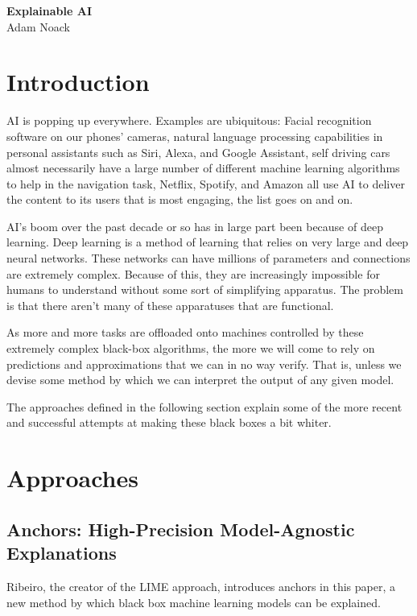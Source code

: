 \documentclass[12pt, letterpaper]{article}
\begin{document}
\begin{center}
\Large{\textbf{Explainable AI}}	\\
Adam Noack
\end{center}
\section{Introduction}
\par AI is popping up everywhere. Examples are ubiquitous: Facial recognition software on our phones' cameras, natural language processing capabilities in personal assistants such as Siri, Alexa, and Google Assistant, self driving cars almost necessarily have a large number of different machine learning algorithms to help in the navigation task, Netflix, Spotify, and Amazon all use AI to deliver the content to its users that is most engaging, the list goes on and on.
\par AI's boom over the past decade or so has in large part been because of deep learning. Deep learning is a method of learning that relies on very large and deep neural networks. These networks can have millions of parameters and connections are extremely complex. Because of this, they are increasingly impossible for humans to understand without some sort of simplifying apparatus. The problem is that there aren't many of these apparatuses that are functional.
\par As more and more tasks are offloaded onto machines controlled by these extremely complex black-box algorithms, the more we will come to rely on predictions and approximations that we can in no way verify. That is, unless we devise some method by which we can interpret the output of any given model.
\par The approaches defined in the following section explain some of the more recent and successful attempts at making these black boxes a bit whiter.
\section{Approaches}
\subsection{Anchors: High-Precision Model-Agnostic Explanations}
	Ribeiro, the creator of the LIME approach, introduces anchors in this paper, a new method by which black box machine learning models can be explained. 
	
\end{document}
